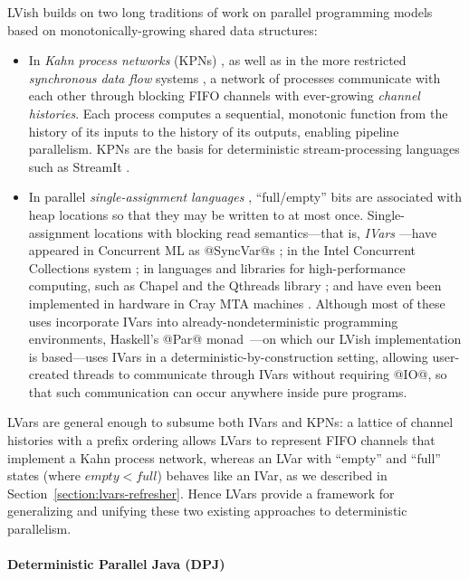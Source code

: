 LVish builds on two long traditions of work on parallel programming
models based on monotonically-growing shared data structures:
\begin{itemize}
\item In {\em Kahn process networks} (KPNs) \cite{Kahn-1974}, as well
  as in the more restricted {\em synchronous data flow} systems
  \cite{Lee-sdn}, a network of processes communicate with each other
  through blocking FIFO channels with ever-growing {\em channel
    histories}.  Each process computes a sequential, monotonic
  function from the history of its inputs to the history of its
  outputs, enabling pipeline parallelism.  KPNs are the basis for
  deterministic stream-processing languages such as StreamIt
  \cite{streamit-asplos}.
\item In parallel {\em single-assignment languages}
  \cite{Tesler-1968}, ``full/empty'' bits are associated with heap
  locations so that they may be written to at most once.
  Single-assignment locations with blocking read semantics---that is,
  \emph{IVars} \cite{IStructures}---have appeared in Concurrent ML as
  @SyncVar@s \cite{reppy-cml-book}; in the Intel Concurrent
  Collections system \cite{CnC}; in languages and libraries for
  high-performance computing, such as Chapel \cite{chapel} and the
  Qthreads library \cite{qthreads}; and have even been implemented in
  hardware in Cray MTA machines \cite{cray-mta}.  Although most of
  these uses incorporate IVars into already-nondeterministic
  programming environments, Haskell's @Par@
  monad~\cite{monad-par}---on which our LVish implementation is
  based---uses IVars in a deterministic-by-construction setting,
  allowing user-created threads to communicate through IVars without
  requiring @IO@, so that such communication can occur anywhere inside
  pure programs.
\end{itemize}
LVars are general enough to subsume both IVars and KPNs: a lattice of
channel histories with a prefix ordering allows LVars to represent
FIFO channels that implement a Kahn process network, whereas an LVar
with ``empty'' and ``full'' states (where $\mathit{empty} <
\mathit{full}$) behaves like an IVar, as we described in
Section~\ref{section:lvars-refresher}.  Hence LVars provide a
framework for generalizing and unifying these two existing approaches
to deterministic parallelism.

\paragraph{Deterministic Parallel Java (DPJ)}

